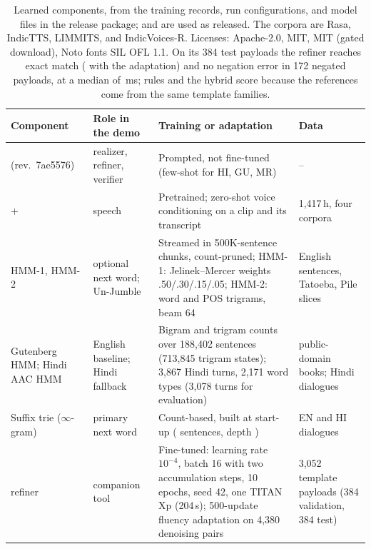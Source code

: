 \begin{table}[t]
\centering\footnotesize
\setlength{\tabcolsep}{3pt}\renewcommand{\arraystretch}{1.08}
\begin{tabular}{@{}L{2.9cm}L{2.4cm}L{7.6cm}L{2.5cm}@{}}
\toprule
{}
Component & Role in the demo & Training or adaptation & Data \\
\midrule
\qwen{} (rev.\ 7ae5576) & realizer, refiner, verifier & Prompted, not fine-tuned (few-shot for HI, GU, MR) & -- \\
\indicf{} + \vocos{} & speech & Pretrained; zero-shot voice conditioning on a clip and its transcript & 1,417\,h, four corpora \\
HMM-1, HMM-2 & optional next word; Un-Jumble & Streamed in 500K-sentence chunks, count-pruned; HMM-1: Jelinek--Mercer weights .50/.30/.15/.05; HMM-2: word and POS trigrams, beam 64 & English sentences, Tatoeba, Pile slices \\
Gutenberg HMM; Hindi AAC HMM & English baseline; Hindi fallback & Bigram and trigram counts over 188,402 sentences (713,845 trigram states); 3,867 Hindi turns, 2,171 word types (3,078 turns for evaluation) & public-domain books; Hindi dialogues \\
Suffix trie ($\infty$-gram) & primary next word & Count-based, built at start-up (\IGSent{} sentences, depth \IGDepth{}) & EN and HI dialogues \\
\flant{} refiner & companion tool & Fine-tuned: learning rate $10^{-4}$, batch 16 with two accumulation steps, 10 epochs, seed 42, one TITAN Xp (204\,s); 500-update fluency adaptation on 4,380 denoising pairs & 3,052 template payloads (384 validation, 384 test) \\
\bottomrule
\end{tabular}
\caption{Learned components, from the training records, run configurations, and model files in the release package; \qwen{} and \indicf{} are used as released. The \indicf{} corpora are Rasa, IndicTTS, LIMMITS, and IndicVoices-R. Licenses: \qwen{} Apache-2.0, \vocos{} MIT, \indicf{} MIT (gated download), Noto fonts SIL OFL 1.1. On its 384 test payloads the refiner reaches \RefAModel{} exact match (\RefFModel{} with the adaptation) and no negation error in 172 negated payloads, at a median of \RefALat{}\,ms; rules and the hybrid score \RefARules{} because the references come from the same template families.}
\label{tab:models}
\end{table}

